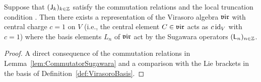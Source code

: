 \begin{theorem}
  \label{thm:SugawaraRepresentation}
  \leanok
  Suppose that $(\mathsf{J}_{k})_{k \in \mathbb{Z}}$ satisfy the commutation relations
  \tagHeiComm{} and the local truncation condition
  \tagHeiTrunc{}. Then there exists a representation of the Virasoro algebra $\mathfrak{vir}$
  with central charge $c = 1$ on $V$ (i.e.,
  the central element $C \in \mathfrak{vir}$ acts as $c \, \mathrm{id}_V$ with $c = 1$)
  where the basis elements $L_n$ of $\mathfrak{vir}$ act by
  the Sugawara operators $(\mathsf{L}_n)_{n \in \mathbb{Z}}$.
\end{theorem}
\begin{proof}
  \leanok
  A direct consequence of the commutation relations in Lemma~\ref{lem:CommutatorSugawara}
  and a comparison with the Lie brackets in the basis of Definition~\ref{def:VirasoroBasis}.
\end{proof}
